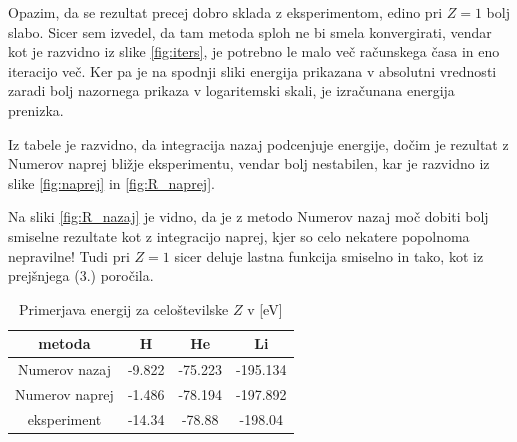 Opazim, da se rezultat precej dobro sklada z eksperimentom, edino pri $Z=1$ bolj slabo. Sicer sem izvedel, da tam metoda sploh ne bi smela konvergirati, vendar kot je razvidno iz slike \ref{fig:iters}, je potrebno le malo več računskega časa in eno iteracijo več. Ker pa je na spodnji sliki energija prikazana v absolutni vrednosti zaradi bolj nazornega prikaza v logaritemski skali, je izračunana energija prenizka.

Iz tabele je razvidno, da integracija nazaj podcenjuje energije, dočim je rezultat z Numerov naprej bližje eksperimentu, vendar bolj nestabilen, kar je razvidno iz slike \ref{fig:naprej} in \ref{fig:R_naprej}.

Na sliki \ref{fig:R_nazaj} je vidno, da je z metodo Numerov nazaj moč dobiti bolj smiselne rezultate kot z integracijo naprej, kjer so celo nekatere popolnoma nepravilne! Tudi pri $Z=1$ sicer deluje lastna funkcija smiselno in tako, kot iz prejšnjega (3.) poročila.


\begin{table}[H]
    \centering
    \begin{tabular}{c|c c c}
        metoda & H & He & Li \\\hline
        Numerov nazaj & -9.822 & -75.223 & -195.134 \\
        Numerov naprej & -1.486 & -78.194 & -197.892 \\
        eksperiment & -14.34 & -78.88 & -198.04
    \end{tabular}
    \caption{Primerjava energij za celoštevilske $Z$ v [eV]}
\end{table}




